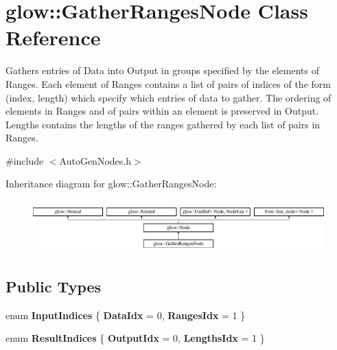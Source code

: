 \hypertarget{classglow_1_1_gather_ranges_node}{}\section{glow\+:\+:Gather\+Ranges\+Node Class Reference}
\label{classglow_1_1_gather_ranges_node}


Gathers entries of Data into Output in groups specified by the elements of Ranges. Each element of Ranges contains a list of pairs of indices of the form (index, length) which specify which entries of data to gather. The ordering of elements in Ranges and of pairs within an element is preserved in Output. Lengths contains the lengths of the ranges gathered by each list of pairs in Ranges.  




{\ttfamily \#include $<$Auto\+Gen\+Nodes.\+h$>$}

Inheritance diagram for glow\+:\+:Gather\+Ranges\+Node\+:\begin{figure}[H]
\begin{center}
\leavevmode
\includegraphics[height=2.028986cm]{classglow_1_1_gather_ranges_node}
\end{center}
\end{figure}
\subsection*{Public Types}
\begin{DoxyCompactItemize}
\item 
\mbox{\label{classglow_1_1_gather_ranges_node_ab83670284f9fed71687db6da53ac6182}} 
enum {\bfseries Input\+Indices} \{ {\bfseries Data\+Idx} = 0, 
{\bfseries Ranges\+Idx} = 1
 \}
\item 
\mbox{\label{classglow_1_1_gather_ranges_node_aba778c2c2b34540da5945d609b618c7d}} 
enum {\bfseries Result\+Indices} \{ {\bfseries Output\+Idx} = 0, 
{\bfseries Lengths\+Idx} = 1
 \}
\end{DoxyCompactItemize}
